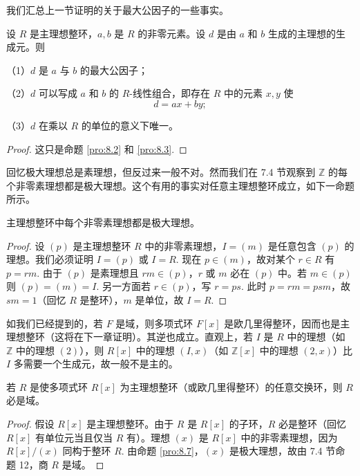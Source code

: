 我们汇总上一节证明的关于最大公因子的一些事实。

\begin{proposition}\label{pro:8.6}
设 \(R\) 是主理想整环，\(a, b\) 是 \(R\) 的非零元素。设 \(d\) 是由 \(a\) 和 \(b\) 生成的主理想的生成元。则

（1）\(d\) 是 \(a\) 与 \(b\) 的最大公因子；

（2）\(d\) 可以写成 \(a\) 和 \(b\) 的 \(R\)-线性组合，即存在 \(R\) 中的元素 \(x, y\) 使
\[
d = ax + by;
\]

（3）\(d\) 在乘以 \(R\) 的单位的意义下唯一。
\end{proposition}

\begin{proof}
这只是命题 \ref{pro:8.2} 和 \ref{pro:8.3}.
\end{proof}

回忆极大理想总是素理想，但反过来一般不对。然而我们在 7.4 节观察到 \(\mathbb{Z}\) 的每个非零素理想都是极大理想。这个有用的事实对任意主理想整环成立，如下一命题所示。

\begin{proposition}\label{pro:8.7}
主理想整环中每个非零素理想都是极大理想。
\end{proposition}

\begin{proof}
设 \((p)\) 是主理想整环 \(R\) 中的非零素理想，\(I = (m)\) 是任意包含 \((p)\) 的理想。我们必须证明 \(I = (p)\) 或 \(I = R\). 现在 \(p \in (m)\)，故对某个 \(r \in R\) 有 \(p = rm\). 由于 \((p)\) 是素理想且 \(rm \in (p)\)，\(r\) 或 \(m\) 必在 \((p)\) 中。若 \(m \in (p)\) 则 \((p) = (m) = I\). 另一方面若 \(r \in (p)\)，写 \(r = ps\). 此时 \(p = rm = psm\)，故 \(sm = 1\)（回忆 \(R\) 是整环），\(m\) 是单位，故 \(I = R\).
\end{proof}

如我们已经提到的，若 \(F\) 是域，则多项式环 \(F[x]\) 是欧几里得整环，因而也是主理想整环（这将在下一章证明）。其逆也成立。直观上，若 \(I\) 是 \(R\) 中的理想（如 \(\mathbb{Z}\) 中的理想 \((2)\)），则 \(R[x]\) 中的理想 \((I, x)\)（如 \(\mathbb{Z}[x]\) 中的理想 \((2, x)\)）比 \(I\) 多需要一个生成元，故一般不是主的。

\begin{corollary}\label{cor:8.8}
若 \(R\) 是使多项式环 \(R[x]\) 为主理想整环（或欧几里得整环）的任意交换环，则 \(R\) 必是域。
\end{corollary}

\begin{proof}
假设 \(R[x]\) 是主理想整环。由于 \(R\) 是 \(R[x]\) 的子环，\(R\) 必是整环（回忆 \(R[x]\) 有单位元当且仅当 \(R\) 有）。理想 \((x)\) 是 \(R[x]\) 中的非零素理想，因为 \(R[x]/(x)\) 同构于整环 \(R\). 由命题 \ref{pro:8.7}，\((x)\) 是极大理想，故由 7.4 节命题 12，商 \(R\) 是域。
\end{proof}

